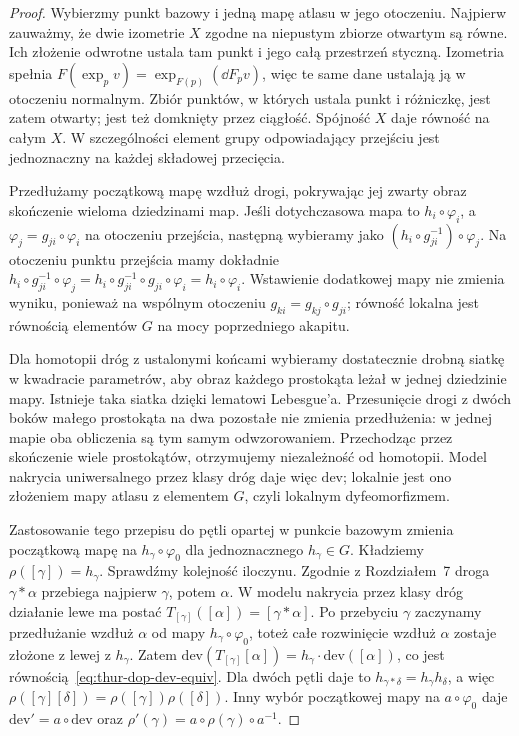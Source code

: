 \begin{proof}
Wybierzmy punkt bazowy i jedną mapę atlasu w jego otoczeniu.
Najpierw zauważmy, że dwie izometrie $X$ zgodne na niepustym
zbiorze otwartym są równe. Ich złożenie odwrotne ustala tam
punkt i jego całą przestrzeń styczną. Izometria spełnia
$F(\exp_p v)=\exp_{F(p)}(\dd F_pv)$, więc te same dane
ustalają ją w otoczeniu normalnym. Zbiór punktów, w których
ustala punkt i różniczkę, jest zatem otwarty; jest też domknięty
przez ciągłość. Spójność $X$ daje równość na całym $X$.
W szczególności element grupy odpowiadający przejściu
jest jednoznaczny na każdej składowej przecięcia.

Przedłużamy początkową mapę wzdłuż drogi, pokrywając jej
zwarty obraz skończenie wieloma dziedzinami map. Jeśli dotychczasowa
mapa to $h_i\circ\varphi_i$, a
$\varphi_j=g_{ji}\circ\varphi_i$ na otoczeniu przejścia,
następną wybieramy jako
$(h_i\circ g_{ji}^{-1})\circ\varphi_j$.
Na otoczeniu punktu przejścia mamy dokładnie
$h_i\circ g_{ji}^{-1}\circ\varphi_j
=h_i\circ g_{ji}^{-1}\circ g_{ji}\circ\varphi_i
=h_i\circ\varphi_i$.
Wstawienie dodatkowej mapy
nie zmienia wyniku, ponieważ na wspólnym otoczeniu
$g_{ki}=g_{kj}\circ g_{ji}$; równość lokalna jest równością
elementów $G$ na mocy poprzedniego akapitu.

Dla homotopii dróg z ustalonymi końcami wybieramy dostatecznie
drobną siatkę w kwadracie parametrów, aby obraz każdego
prostokąta leżał w jednej dziedzinie mapy. Istnieje taka
siatka dzięki lematowi Lebesgue'a. Przesunięcie drogi
z dwóch boków małego prostokąta na dwa pozostałe nie zmienia
przedłużenia: w jednej mapie oba obliczenia są tym samym
odwzorowaniem. Przechodząc przez skończenie wiele prostokątów,
otrzymujemy niezależność od homotopii. Model nakrycia uniwersalnego
przez klasy dróg daje więc $\mathrm{dev}$; lokalnie jest ono
złożeniem mapy atlasu z elementem $G$, czyli lokalnym dyfeomorfizmem.

Zastosowanie tego przepisu do pętli opartej w punkcie
bazowym zmienia początkową mapę na
$h_\gamma\circ\varphi_0$ dla jednoznacznego $h_\gamma\in G$.
Kładziemy $\rho([\gamma])=h_\gamma$.
Sprawdźmy kolejność iloczynu. Zgodnie z Rozdziałem~7
droga $\gamma*\alpha$ przebiega najpierw $\gamma$, potem $\alpha$.
W modelu nakrycia przez klasy dróg działanie lewe ma postać
$T_{[\gamma]}([\alpha])=[\gamma*\alpha]$.
Po przebyciu $\gamma$ zaczynamy przedłużanie wzdłuż $\alpha$
od mapy $h_\gamma\circ\varphi_0$, toteż całe rozwinięcie
wzdłuż $\alpha$ zostaje złożone z lewej z $h_\gamma$.
Zatem
$\mathrm{dev}(T_{[\gamma]}[\alpha])
=h_\gamma\cdot\mathrm{dev}([\alpha])$,
co jest równością~\eqref{eq:thur-dop-dev-equiv}.
Dla dwóch pętli daje to
$h_{\gamma*\delta}=h_\gamma h_\delta$, a więc
$\rho([\gamma][\delta])=\rho([\gamma])\rho([\delta])$.
Inny wybór
początkowej mapy na $a\circ\varphi_0$ daje
$\mathrm{dev}'=a\circ\mathrm{dev}$ oraz
$\rho'(\gamma)=a\circ\rho(\gamma)\circ a^{-1}$.
\end{proof}

